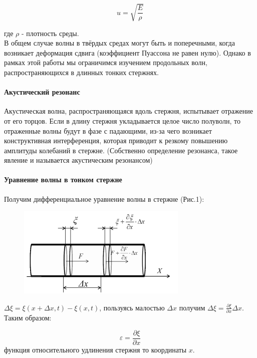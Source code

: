 \documentclass[a4paper,12pt]{article}
\begin{document}
	\begin{equation}
		\label{u}
		u=\sqrt{\frac{E}{\rho}}
	\end{equation}
	
	где $\rho$ - плотность среды.\\
	
	В общем случае волны в твёрдых средах могут быть и поперечными, когда возникает деформация сдвига (коэффициент Пуассона не равен нулю). Однако в рамках этой работы мы ограничимся изучением продольных волн, распространяющихся в длинных тонких стержнях.
	
	\paragraph{Акустический резонанс}
	Акустическая волна, распространяющаяся вдоль стержня, испытывает отражение от его торцов. Если в длину стержня укладывается целое число полуволн, то отраженные волны будут в фазе с падающими, из-за чего возникает конструктивная интерференция, которая приводит к резкому повышению амплитуды колебаний в стержне. (Собственно определение резонанса, такое явление и называется акустическим резонансом)\\
	
	\paragraph{Уравнение волны в тонком стержне}
	
	Получим дифференциальное уравнение волны в стержне (Рис.1):\\
	
	\begin{figure}[H]
		\centering
		\includegraphics[width=0.5\linewidth]{fig1}
		\caption{}
		\label{fig:fig1}
	\end{figure}
	
	
	$\Delta \xi=\xi(x+\Delta x,t)-\xi(x,t)$, пользуясь малостью $\Delta x$ получим $\Delta \xi = \frac{\partial \xi}{\partial x}\Delta x$. Таким образом:
	
	\begin{equation}
		\label{varepsilon}
		\varepsilon=\frac{\partial \xi}{\partial x}
	\end{equation}
	функция относительного удлинения стержня то координаты $x$.\\
	
\end{document}
